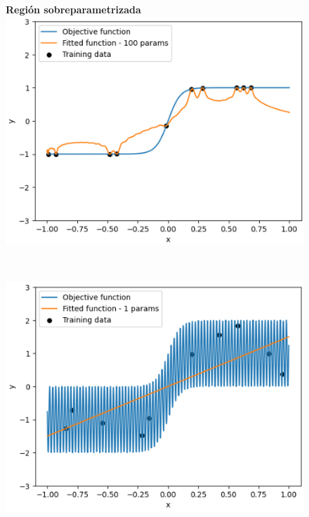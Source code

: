 \begin{figure}[h]
\begin{minipage}{0.32\textwidth}
    \end{minipage}
    \begin{minipage}{0.32\textwidth}
        \centering
        \textbf{Región sobreparametrizada} \\[0.5ex] 
        \includegraphics[width=\linewidth]{img/experiments/hiperbolica_noiseless1.3.png}
    \end{minipage} \\
    \begin{minipage}{0.32\textwidth}
        \centering
        \includegraphics[width=\linewidth]{img/experiments/hiperbolica_noise1.1.png}
    \end{minipage}
    \begin{minipage}{0.32\textwidth}

\end{minipage}
\end{figure}
